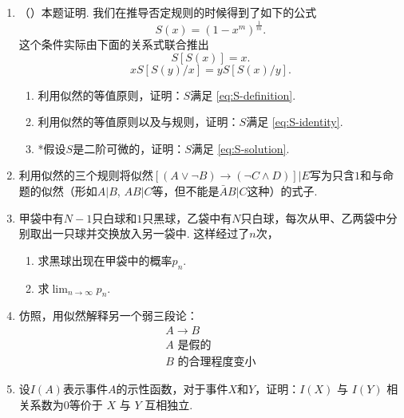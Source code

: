\begin{enumerate}[wide, labelindent=0pt]
    
    \item \label{exercise:derive-S} （\cite{coxProbabilityFrequencyReasonable1946}）本题证明. 我们在推导否定规则的时候得到了如下的公式
    \begin{equation}
        S(x) = (1-x^m)^\frac{1}{m}. \label{eq:S-solution}
    \end{equation}
    这个条件实际由下面的关系式联合推出
    \begin{equation}
        S[S(x)] = x. \label{eq:S-definition}
    \end{equation}
    \begin{equation}
        x S[S(y)/x] = y S[S(x)/y]. \label{eq:S-identity}
    \end{equation}
    \begin{enumerate}
        \item 利用似然的等值原则，证明：$S$满足 \eqref{eq:S-definition}.
        \item 利用似然的等值原则以及与规则，证明：$S$满足 \eqref{eq:S-identity}.
        \item *假设$S$是二阶可微的，证明：$S$满足 \eqref{eq:S-solution}.
    \end{enumerate}
    
    \item 利用似然的三个规则将似然$[(A \vee \neg B) \to (\neg C \wedge D)]  |  E$写为只含$1$和与命题的似然（形如$A|B$, $AB|C$等，但不能是$\bar{A}B|C$这种）的式子.

    \item 甲袋中有$N-1$只白球和$1$只黑球，乙袋中有$N$只白球，每次从甲、乙两袋中分别取出一只球并交换放入另一袋中. 这样经过了$n$次，
        \begin{enumerate}
            \item   求黑球出现在甲袋中的概率$p_n$.
            \item   求$\lim_{n\to\infty}p_n$.
        \end{enumerate}
    
    \item 仿照，用似然解释另一个弱三段论：
    \[
    \begin{array}{c}  
        A \to B \\ A\text{ 是假的} \\ \hline B\text{ 的合理程度变小}
    \end{array}
    \]

    \item 设$I(A)$表示事件$A$的示性函数，对于事件$X$和$Y$，证明：$I(X)$ 与 $I(Y)$ 相关系数为$0$等价于 $X$ 与 $Y$ 互相独立.


\end{enumerate}
